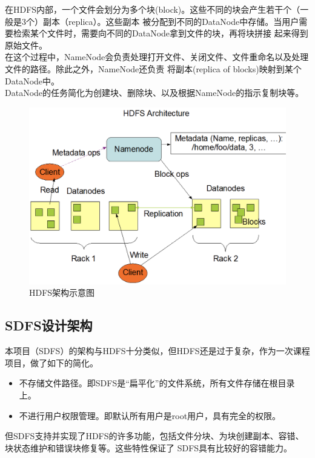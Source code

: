 \documentclass[a4paper]{article}
\begin{document}
在HDFS内部，一个文件会划分为多个块(block)。这些不同的块会产生若干个（一般是3个）副本（replica）。这些副本
被分配到不同的DataNode中存储。当用户需要检索某个文件时，需要向不同的DataNode拿到文件的块，再将块拼接
起来得到原始文件。\\

在这个过程中，NameNode会负责处理打开文件、关闭文件、文件重命名以及处理文件的路径。除此之外，NameNode还负责
将副本(replica of blocks)映射到某个DataNode中。\\

DataNode的任务简化为创建块、删除块、以及根据NameNode的指示复制块等。

\begin{figure}[!hbt]
    \begin{center}
    \includegraphics[scale=0.3]{assets/hdfs.png}
    \caption{HDFS架构示意图\label{fig:hdfs}} 
    \end{center} 
\end{figure} 
\subsection{SDFS设计架构}
本项目（SDFS）的架构与HDFS十分类似，但HDFS还是过于复杂，作为一次课程项目，做了如下的简化。
\begin{itemize}
    \item 不存储文件路径。即SDFS是``扁平化''的文件系统，所有文件存储在根目录上。
    \item 不进行用户权限管理。即默认所有用户是root用户，具有完全的权限。
\end{itemize}
但SDFS支持并实现了HDFS的许多功能，包括文件分块、为块创建副本、容错、块状态维护和错误块修复等。这些特性保证了
SDFS具有比较好的容错能力。\\
\end{document}

